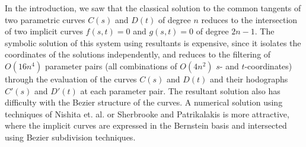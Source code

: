 \documentclass[10pt,twocolumn]{article}
\begin{document}
In the introduction, we saw that the classical solution to the common tangents
of two parametric curves $C(s)$ and $D(t)$ of degree $n$
reduces to the intersection of two implicit curves $f(s,t)=0$ and $g(s,t)=0$
of degree $2n-1$.
The symbolic solution of this system using resultants is expensive,
since it isolates the coordinates of the solutions independently,
and reduces to the filtering of $O(16n^4)$ parameter pairs (all combinations
of $O(4n^2)$ $s$- and $t$-coordinates)
through the evaluation of the curves $C(s)$ and $D(t)$ and their hodographs $C'(s)$ and $D'(t)$
at each parameter pair.
The resultant solution also has difficulty with the Bezier structure 
of the curves.
A numerical solution using techniques of Nishita et. al. \cite{nishita90}
or Sherbrooke and Patrikalakis \cite{sherbrooke93} is more attractive, 
where the implicit curves are expressed in the Bernstein basis and intersected
using Bezier subdivision techniques.
\end{document}

